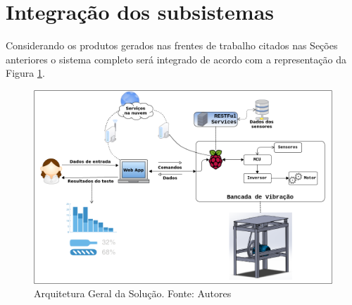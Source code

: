 
\section{Integração dos subsistemas}

Considerando os produtos gerados nas frentes de trabalho citados nas Seções anteriores o sistema completo será integrado de acordo com 
a representação da Figura \ref{fig:arquitetura_solucao}.

\begin{figure}[H]
\centering
\includegraphics[scale=0.45]{figuras/arquitetura_solucao.png}
\caption{Arquitetura Geral da Solução.  Fonte: Autores}
\label{fig:arquitetura_solucao}
\end{figure}

